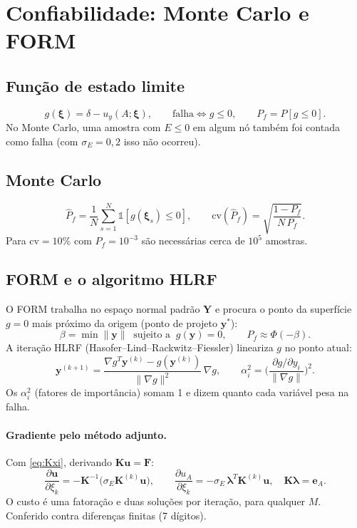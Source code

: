 \documentclass[11pt,a4paper]{article}
\newcommand{\bxi}{\bm{\xi}}
\begin{document}
\section{Confiabilidade: Monte Carlo e FORM}\label{sec:conf}
\subsection{Função de estado limite}
\begin{equation}
  g(\bxi)=\delta-u_y(A;\bxi),\qquad \text{falha}\iff g\le0,\qquad P_f=P[g\le0].
\end{equation}
No Monte Carlo, uma amostra com $E\le0$ em algum nó também foi contada como falha (com $\sigma_E=0{,}2$ isso não ocorreu).

\subsection{Monte Carlo}
\begin{equation}
  \hat P_f=\frac1N\sum_{s=1}^N\mathbb{1}[g(\bxi_s)\le0],\qquad
  \mathrm{cv}(\hat P_f)=\sqrt{\frac{1-P_f}{N\,P_f}} .
\end{equation}
Para $\mathrm{cv}=10\%$ com $P_f=10^{-3}$ são necessárias cerca de $10^5$ amostras.

\subsection{FORM e o algoritmo HLRF}
O FORM trabalha no espaço normal padrão $\bm{Y}$ e procura o ponto da superfície $g=0$ mais próximo da origem (ponto de projeto $\bm{y}^*$):
\begin{equation}
  \beta=\min\|\bm{y}\|\ \text{ sujeito a }\ g(\bm{y})=0,\qquad P_f\approx\Phi(-\beta).
\end{equation}
A iteração HLRF (Hasofer--Lind--Rackwitz--Fiessler) lineariza $g$ no ponto atual:
\begin{equation}
  \bm{y}^{(k+1)}=\frac{\nabla g^{T}\bm{y}^{(k)}-g(\bm{y}^{(k)})}{\|\nabla g\|^2}\,\nabla g ,
  \qquad \alpha_i^2=\Big(\frac{\partial g/\partial y_i}{\|\nabla g\|}\Big)^2 .
\end{equation}
Os $\alpha_i^2$ (fatores de importância) somam 1 e dizem quanto cada variável pesa na falha.

\paragraph{Gradiente pelo método adjunto.} Com \eqref{eq:Kxi}, derivando $\bm{K}\bm{u}=\bm{F}$:
\begin{equation}
  \frac{\partial\bm{u}}{\partial\xi_k}=-\bm{K}^{-1}\big(\sigma_E\bm{K}^{(k)}\bm{u}\big),\qquad
  \frac{\partial u_A}{\partial\xi_k}=-\sigma_E\,\bm{\lambda}^T\bm{K}^{(k)}\bm{u},\quad \bm{K}\bm{\lambda}=\bm{e}_A .
\end{equation}
O custo é uma fatoração e duas soluções por iteração, para qualquer $M$. Conferido contra diferenças finitas (7 dígitos).
\end{document}
